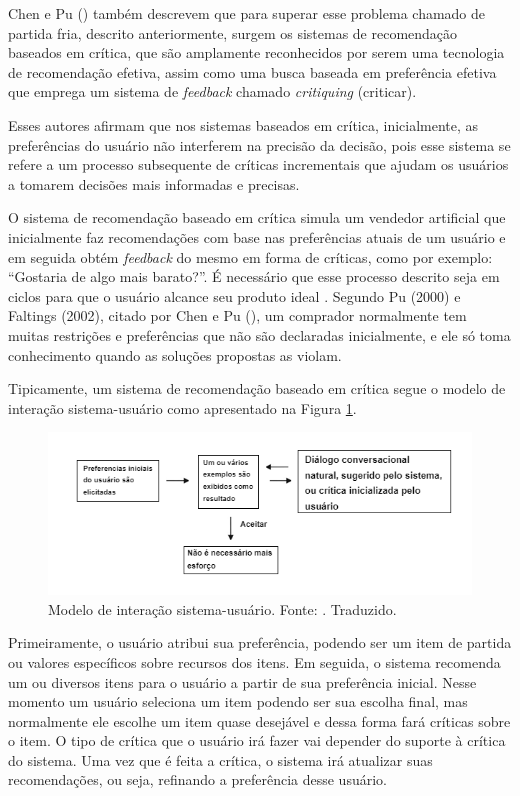 Chen e Pu (\citeyear{Chen:2012}) também descrevem que para superar esse problema chamado de partida fria, descrito anteriormente, surgem os sistemas de recomendação baseados em crítica, que são amplamente reconhecidos por serem uma tecnologia de recomendação efetiva, assim como uma busca baseada em preferência efetiva que emprega um sistema de \textit{feedback} chamado \textit{critiquing} (criticar).

Esses autores afirmam que nos sistemas baseados em crítica, inicialmente, as preferências do usuário não interferem na precisão da decisão, pois esse sistema se refere a um processo subsequente de críticas incrementais que ajudam os usuários a tomarem decisões mais informadas e precisas.

O sistema de recomendação baseado em crítica simula um vendedor artificial que inicialmente faz recomendações com base nas preferências atuais de um usuário e em seguida obtém \textit{feedback} do mesmo em forma de críticas, como por exemplo: “Gostaria de algo mais barato?”. É necessário que esse processo descrito seja em ciclos para que o usuário alcance seu produto ideal \cite{Chen:2012}. Segundo Pu (2000) e Faltings (2002), citado por Chen e Pu (\citeyear{Chen:2012}), um comprador normalmente tem muitas restrições e preferências que não são declaradas inicialmente, e ele só toma conhecimento quando as soluções propostas as violam.

Tipicamente, um sistema de recomendação baseado em crítica segue o modelo de interação sistema-usuário como apresentado na Figura \ref{fig:sistema_usuario}.

\begin{figure}[H]
    \centering
    \includegraphics[scale=0.75]{figuras/referencial_teorico/sistema_usuario.png}
    \caption[Modelo de interação sistema-usuário]{Modelo de interação sistema-usuário. Fonte: \cite{Chen:2012}. Traduzido.}
    \label{fig:sistema_usuario}
\end{figure}

Primeiramente, o usuário atribui sua preferência, podendo ser um item de partida ou valores específicos sobre recursos dos itens. Em seguida, o sistema recomenda um ou diversos itens para o usuário a partir de sua preferência inicial. Nesse momento um usuário seleciona um item podendo ser sua escolha final, mas normalmente ele escolhe um item quase desejável e dessa forma fará críticas sobre o item. O tipo de crítica que o usuário irá fazer vai depender do suporte à crítica do sistema. Uma vez que é feita a crítica, o sistema irá atualizar suas recomendações, ou seja, refinando a preferência desse usuário.

